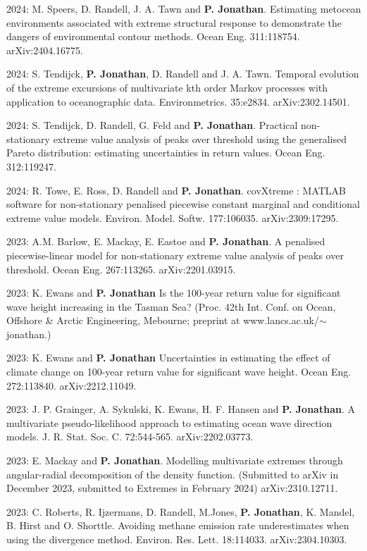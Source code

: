 \documentclass[11pt,a4paper]{moderncv}
\begin{document}
2024: M. Speers, D. Randell, J. A. Tawn and \textbf{P. Jonathan}. Estimating metocean environments associated with extreme structural response to demonstrate the dangers of environmental contour methods. Ocean Eng. 311:118754. arXiv:2404.16775.

2024: S. Tendijck, \textbf{P. Jonathan}, D. Randell and J. A. Tawn. Temporal evolution of the extreme excursions of multivariate kth order Markov processes with application to oceanographic data. Environmetrics. 35:e2834. arXiv:2302.14501.

2024: S. Tendijck, D. Randell, G. Feld and \textbf{P. Jonathan}. Practical non-stationary extreme value analysis of peaks over threshold using the generalised Pareto distribution: estimating uncertainties in return values. Ocean Eng. 312:119247.

2024: R. Towe, E. Ross, D. Randell and \textbf{P. Jonathan}. covXtreme : MATLAB software for non-stationary penalised piecewise constant marginal and conditional extreme value models. Environ. Model. Softw. 177:106035. arXiv:2309:17295.

2023:  A.M. Barlow, E. Mackay, E. Eastoe and \textbf{P. Jonathan}. A penalised piecewise-linear model for non-stationary extreme value analysis of peaks over threshold. Ocean Eng. 267:113265. arXiv:2201.03915.

2023: K. Ewans and \textbf{P. Jonathan} Is the 100-year return value for significant wave height increasing in the Tasman Sea? (Proc. 42th Int. Conf. on Ocean, Offshore \& Arctic Engineering, Mebourne; preprint at  www.lancs.ac.uk/$\sim$jonathan.)

2023: K. Ewans and \textbf{P. Jonathan} Uncertainties in estimating the effect of climate change on 100-year return value for significant wave height. Ocean Eng. 272:113840. arXiv:2212.11049.

2023: J. P. Grainger, A. Sykulski, K. Ewans, H. F. Hansen and \textbf{P. Jonathan}. A multivariate pseudo-likelihood approach to estimating ocean wave direction models. J. R. Stat. Soc. C. 72:544-565.  arXiv:2202.03773.

2023: E. Mackay and \textbf{P. Jonathan}. Modelling multivariate extremes through angular-radial decomposition of the density function. (Submitted to arXiv in December 2023, submitted to Extremes in February 2024) arXiv:2310.12711.

2023: C. Roberts, R. Ijzermans, D. Randell, M.Jones, \textbf{P. Jonathan}, K. Mandel, B. Hirst and O. Shorttle. Avoiding methane emission rate underestimates when using the divergence method. Environ. Res. Lett. 18:114033. arXiv:2304.10303.
\end{document}
